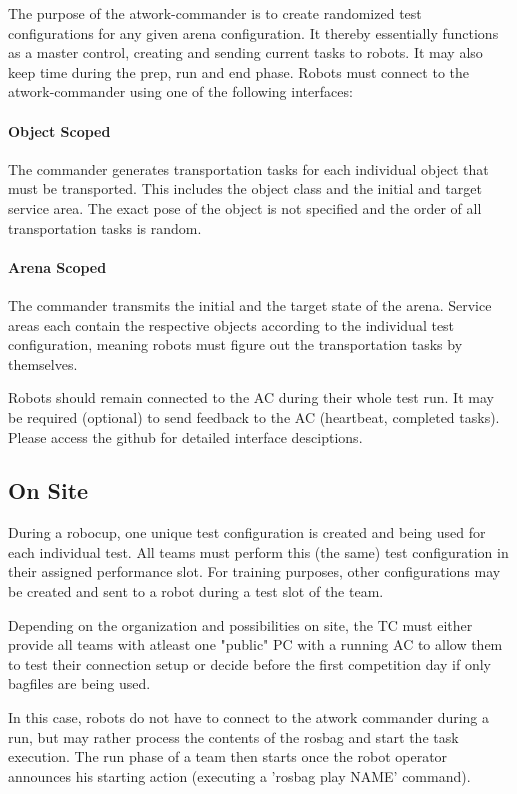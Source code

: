 The purpose of the atwork-commander is to create randomized test configurations for any given arena configuration.
It thereby essentially functions as a master control, creating and sending current tasks to robots.
It may also keep time during the prep, run and end phase.
Robots must connect to the atwork-commander using one of the following interfaces:

\paragraph{Object Scoped}
The commander generates transportation tasks for each individual object that must be transported.
This includes the object class and the initial and target service area.
The exact pose of the object is not specified and the order of all transportation tasks is random.

\paragraph{Arena Scoped}
The commander transmits the initial and the target state of the arena.
Service areas each contain the respective objects according to the individual test configuration,
meaning robots must figure out the transportation tasks by themselves.

Robots should remain connected to the AC during their whole test run.
It may be required (optional) to send feedback to the AC (heartbeat, completed tasks).
Please access the github for detailed interface desciptions.

\subsection{On Site}

During a robocup, one unique test configuration is created and being used for each individual test.
All teams must perform this (the same) test configuration in their assigned performance slot.
For training purposes, other configurations may be created and sent to a robot during a test slot of the team.

Depending on the organization and possibilities on site, the TC must either provide all teams with atleast one "public" PC with a running AC to allow them to test their connection setup or decide before the first competition day if only bagfiles are being used.

In this case, robots do not have to connect to the atwork commander during a run, but may rather process the contents of the rosbag and start the task execution.
The run phase of a team then starts once the robot operator announces his starting action (executing a 'rosbag play NAME' command). 




